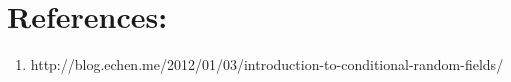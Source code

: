 \documentclass[10pt] {article}
\begin{document}
\section{References:}
\begin{enumerate}
\item http://blog.echen.me/2012/01/03/introduction-to-conditional-random-fields/
\end{enumerate}



\end{document}
